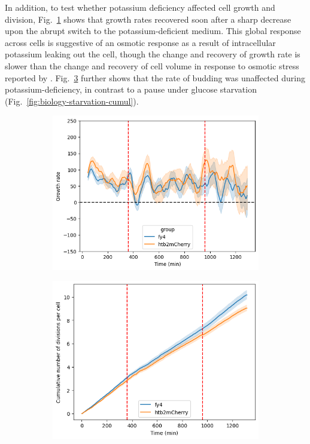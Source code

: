 In addition, to test whether potassium deficiency affected cell growth and division, Fig.\ \ref{fig:biology-kdeficient-gr} shows that growth rates recovered soon after a sharp decrease upon the abrupt switch to the potassium-deficient medium.
This global response across cells is suggestive of an osmotic response as a result of intracellular potassium leaking out the cell, though the change and recovery of growth rate is slower than the change and recovery of cell volume in response to osmotic stress reported by \textcite{granadosDistributingTasksMultiple2017}.
Fig.\ \ref{fig:biology-kdeficient-cumul} further shows that the rate of budding was unaffected during potassium-deficiency, in contrast to a pause under glucose starvation (Fig.\ \ref{fig:biology-starvation-cumul}).

\begin{figure}[ht!]
  \centering
  \begin{subfigure}[htpb]{0.45\textwidth}
   \centering
   \includegraphics[width=\textwidth]{allstrains_613_gr}
   \caption{
   }
   \label{fig:biology-kdeficient-gr}
  \end{subfigure}%
  \begin{subfigure}[htpb]{0.45\textwidth}
   \centering
   \includegraphics[width=\textwidth]{allstrains_613_cumul}
   \caption{
   }
   \label{fig:biology-kdeficient-cumul}
  \end{subfigure}


\end{figure}
